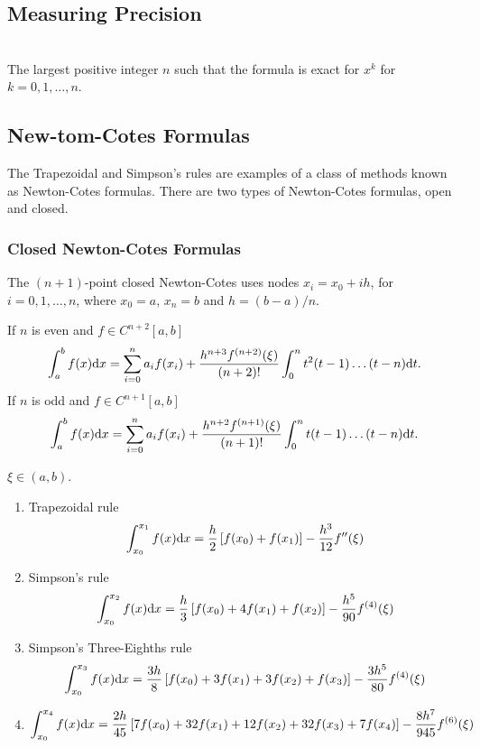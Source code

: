 \subsection{Measuring Precision}
\begin{defn}\hfill\\
The largest positive integer $n$ such that the formula is exact for $x^k$ for $k=0,1,\ldots,n$.
\end{defn}

\subsection{New-tom-Cotes Formulas}
The Trapezoidal and Simpson's rules are examples of a class of methods known as Newton-Cotes formulas. There are two types of Newton-Cotes formulas, open and closed.

\subsubsection{Closed Newton-Cotes Formulas}
The $(n+1)$-point closed Newton-Cotes uses nodes $x_i=x_0+ih$, for $i=0,1,\ldots,n$, where $x_0=a$, $x_n=b$ and $h=(b-a)/n$.
\begin{theo}
If $n$ is even and $f\in C^{n+2}[a,b]$
\[
\int_a^bf(x)\mathrm{d} x=\sum_{i=0}^na_if(x_i)+\frac{h^{n+3}f^{(n+2)}(\xi)}{(n+2)!}\int_0^nt^2(t-1)\ldots(t-n)\mathrm{d} t.
\]
If $n$ is odd and $f\in C^{n+1}[a,b]$
\[
\int_a^bf(x)\mathrm{d} x=\sum_{i=0}^na_if(x_i)+\frac{h^{n+2}f^{(n+1)}(\xi)}{(n+1)!}\int_0^nt(t-1)\ldots(t-n)\mathrm{d} t.
\]

$\xi\in(a,b)$.
\end{theo}

\begin{enumerate}[n=1]
    \item Trapezoidal rule
        \begin{align*}
        \int_{x_0}^{x_1}f(x)\mathrm{d} x=\frac{h}{2}\left[f(x_0)+f(x_1)\right]-\frac{h^3}{12}f''(\xi)
        \end{align*}
    \item Simpson's rule
        \begin{align*}
        \int_{x_0}^{x_2}f(x)\mathrm{d} x=\frac{h}{3}\left[f(x_0)+4f(x_1)+f(x_2)\right]-\frac{h^5}{90}f^{(4)}(\xi)
        \end{align*}
    \item Simpson's Three-Eighths rule
        \begin{align*}
        \int_{x_0}^{x_3}f(x)\mathrm{d} x=\frac{3h}{8}\left[f(x_0)+3f(x_1)+3f(x_2)+f(x_3)\right]-\frac{3h^5}{80}f^{(4)}(\xi)
        \end{align*}
    \item \phantom{Unknown Name}
        \begin{align*}
        \int_{x_0}^{x_4}f(x)\mathrm{d} x=\frac{2h}{45}\left[7f(x_0)+32f(x_1)+12f(x_2)+32f(x_3)+7f(x_4)\right]-\frac{8h^7}{945}f^{(6)}(\xi)
        \end{align*}
\end{enumerate}



